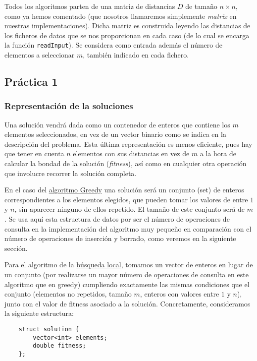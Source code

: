 \documentclass[10pt,a4paper]{article}
\begin{document}
	Todos los algoritmos parten de una matriz de distancias $D$ de tamaño $n\times n$, como ya hemos comentado (que nosotros llamaremos simplemente \textit{matrix} en nuestras implementaciones). Dicha matriz es construida leyendo las distancias de los ficheros de datos que se nos proporcionan en cada caso (de lo cual se encarga la función \lstinline|readInput|). Se considera como entrada además el número de elementos a seleccionar $m$, también indicado en cada fichero. 
	\subsection{Práctica 1}
	
	\subsubsection{Representación de la soluciones}
	
	Una solución vendrá dada como un contenedor de enteros que contiene los $m$ elementos seleccionados, en vez de un vector binario como se indica en la descripción del problema. Esta última representación es menos eficiente, pues hay que tener en cuenta $n$ elementos con sus distancias en vez de $m$ a la hora de calcular la bondad de la solución (\textit{fitness}), así como en cualquier otra operación que involucre recorrer la solución completa.
	
	En el caso del \underline{algoritmo Greedy} una solución será un conjunto (set) de enteros correspondientes a los elementos elegidos, que pueden tomar los valores de entre $1$ y $n$, sin aparecer ninguno de ellos repetido. El tamaño de este conjunto será de $m$. Se usa aquí esta estructura de datos por ser el número de operaciones de consulta en la implementación del algoritmo muy pequeño en comparación con el número de operaciones de inserción y borrado, como veremos en la siguiente sección. 
	
	 Para el algoritmo de la \underline{búsqueda local}, tomamos un vector de enteros en lugar de un conjunto (por realizarse un mayor número de operaciones de consulta en este algoritmo que en greedy) cumpliendo exactamente las mismas condiciones que el conjunto (elementos no repetidos, tamaño $m$, enteros con valores entre $1$ y $n$),  junto con el valor de fitness asociado a la solución. Concretamente, consideramos la siguiente estructura:

	\begin{lstlisting}
	struct solution {
		vector<int> elements;
		double fitness;
	};
	\end{lstlisting}
	
\end{document}
